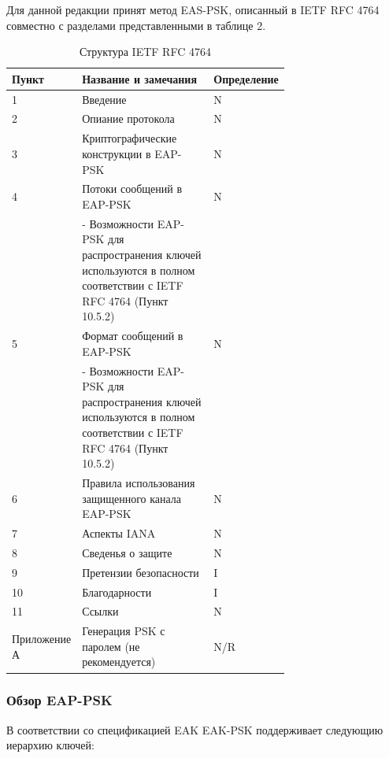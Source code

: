 Для данной редакции принят метод EAS-PSK, описанный в IETF RFC 4764 совместно с разделами представленными в таблице 2.%


\begin{longtable}{|l|p{0.7\linewidth}|l|}
  \caption{Структура IETF RFC 4764} \\ %
   \hline 
   Пункт & Название и замечания & Определение \\
   \hline
   1 & Введение & N \\ \hline
   2 & Опиание протокола & N \\ \hline
   3 & Криптографические конструкции в EAP-PSK & N \\ \hline
   4 & Потоки сообщений в EAP-PSK & N \\ & - Возможности EAP-PSK для распространения ключей используются в полном соответствии с IETF RFC 4764 (Пункт 10.5.2) & \\ \hline
   5 & Формат сообщений в EAP-PSK & N \\ & - Возможности EAP-PSK для распространения ключей используются в полном соответствии с IETF RFC 4764 (Пункт 10.5.2) & \\ \hline
   6 & Правила использования защищенного канала EAP-PSK & N \\ \hline
   7 & Аспекты IANA & N \\ \hline
   8 & Сведенья о защите & N \\ \hline
   9 & Претензии безопасности & I \\ \hline
   10 & Благодарности & I \\ \hline
   11 & Ссылки & N \\ \hline
   Приложение А & Генерация PSK с паролем (не рекомендуется) & N/R \\ \hline
\end{longtable}

\subsubsection{Обзор EAP-PSK}

В соответствии со спецификацией EAK EAK-PSK поддерживает следующию иерархию ключей:

